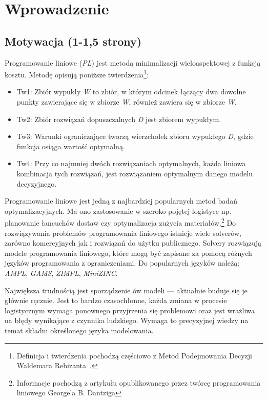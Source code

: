 
\chapter{Wprowadzenie}

\section{Motywacja (1-1,5 strony)}

Programowanie liniowe (\textit{PL}) jest metodą minimalizacji wieloaspektowej z funkcją kosztu. Metodę opisują poniższe twierdzenia\footnote{Definicja i twierdzenia pochodzą częściowo z Metod Podejmowania Decyzji Waldemara Rebizanta~\cite{rebizant2012metody}.}:
\begin{itemize}
\item Tw1: Zbiór wypukły \textit{W} to zbiór, w którym odcinek łączący dwa dowolne punkty zawierające się w zbiorze \textit{W}, również zawiera się w zbiorze \textit{W}.

\item Tw2: Zbiór rozwiązań dopuszczalnych \textit{D} jest zbiorem wypukłym.

\item Tw3: Warunki ograniczające tworzą wierzchołek zbioru wypukłego \textit{D}, gdzie funkcja osiąga wartość optymalną.

\item Tw4: Przy co najmniej dwóch rozwiązaniach optymalnych, każda liniowa kombinacja tych rozwiązań, jest rozwiązaniem optymalnym danego modelu decyzyjnego.
\end{itemize}
Programowanie liniowe jest jedną z najbardziej popularnych metod badań optymalizacyjnych. Ma ono zastosowanie w szeroko pojętej logistyce np. planowanie łancuchów dostaw czy optymalizacja zużycia materiałów.\footnote{Informacje pochodzą z artykułu opublikowanego przez twórcę programowania liniowego George'a B. Dantziga\cite{dantzig2002linear}} Do rozwiązywania problemów programowania liniowego istnieje wiele solverów, zarówno komercyjnych jak i rozwiązań do użytku publicznego. Solvery rozwiązują modele programowania liniowego, które mogą być zapisane za pomocą różnych języków programowania z ograniczeniami. Do popularnych języków należą: \textit{AMPL}, \textit{GAMS}, \textit{ZIMPL}, \textit{MiniZINC}.

Największa trudnością jest sporządzenie ów modeli --- aktualnie buduje się je głównie ręcznie. Jest to bardzo czasochłonne, każda zmiana w procesie logistycznym wymaga ponownego przyjrzenia się problemowi oraz jest wrażliwa na błędy wynikające z czynnika ludzkiego. Wymaga to precyzyjnej wiedzy na temat składni określonego języka modelowania.

